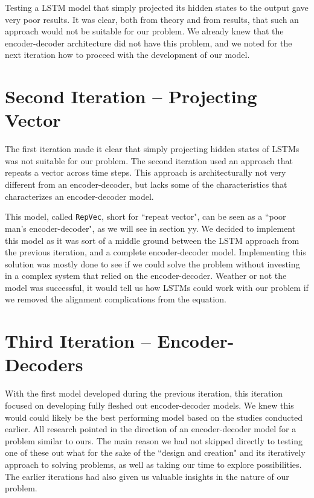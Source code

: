 Testing a LSTM model that simply projected its hidden states to the output gave very poor results. It was clear, both from theory and from results, that such an approach would not be suitable for our problem. We already knew that the encoder-decoder architecture did not have this problem, and we noted for the next iteration how to proceed with the development of our model. 


\section{Second Iteration -- Projecting Vector}
The first iteration made it clear that simply projecting hidden states of LSTMs was not suitable for our problem. The second iteration used an approach that repeats a vector across time steps. This approach is architecturally not very different from an encoder-decoder, but lacks some of the characteristics that characterizes an encoder-decoder model.

This model, called {\tt RepVec}, short for ``repeat vector", can be seen as a ``poor man's encoder-decoder", as we will see in section yy. We decided to implement this model as it was sort of a middle ground between the LSTM approach from the previous iteration, and a complete encoder-decoder model. Implementing this solution was mostly done to see if we could solve the problem without investing in a complex system that relied on the encoder-decoder. Weather or not the model was successful, it would tell us how LSTMs could work with our problem if we removed the alignment complications from the equation.


\section{Third Iteration -- Encoder-Decoders}
With the first model developed during the previous iteration, this iteration focused on developing fully fleshed out encoder-decoder models. We knew this would could likely be the best performing model based on the studies conducted earlier. All research pointed in the direction of an encoder-decoder model for a problem similar to ours. The main reason we had not skipped directly to testing one of these out what for the sake of the ``design and creation" and its iteratively approach to solving problems, as well as taking our time to explore possibilities. The earlier iterations had also given us valuable insights in the nature of our problem.

